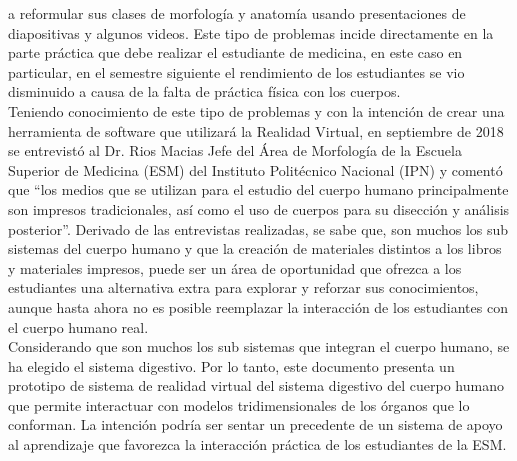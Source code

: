a reformular sus clases de morfología y anatomía usando presentaciones de diapositivas y algunos videos. Este tipo de problemas incide directamente 
en la parte práctica que debe realizar el estudiante de medicina, en este caso en particular, en el semestre siguiente el rendimiento de los estudiantes 
se vio disminuido a causa de la falta de práctica física con los cuerpos.\\
Teniendo conocimiento de este tipo de problemas y con la intención de crear una herramienta de software que utilizará la Realidad Virtual, en septiembre 
de 2018 se entrevistó al Dr. Rios Macias Jefe del Área de Morfología de la Escuela Superior de Medicina (ESM) del Instituto Politécnico Nacional (IPN) y 
comentó que “los medios que se utilizan para el estudio del cuerpo humano principalmente son impresos tradicionales, así como el uso de cuerpos para su 
disección y análisis posterior”. Derivado de las entrevistas realizadas, se sabe que, son muchos los sub sistemas del cuerpo humano y que la creación de 
materiales distintos a los libros y materiales impresos, puede ser un área de oportunidad que ofrezca a los estudiantes una alternativa extra para explorar 
y reforzar sus conocimientos, aunque hasta ahora no es posible reemplazar la interacción de los estudiantes con el cuerpo humano real.\\
Considerando que son muchos los sub sistemas que integran el cuerpo humano, se ha elegido el sistema digestivo. Por lo tanto, este documento 
presenta un prototipo de sistema de realidad virtual del sistema digestivo del cuerpo humano que permite interactuar con modelos tridimensionales 
de los órganos que lo conforman. La intención podría ser sentar un precedente de un sistema de apoyo al aprendizaje que favorezca la 
interacción práctica\cite{moore1995learning} de los estudiantes de la ESM.\\

